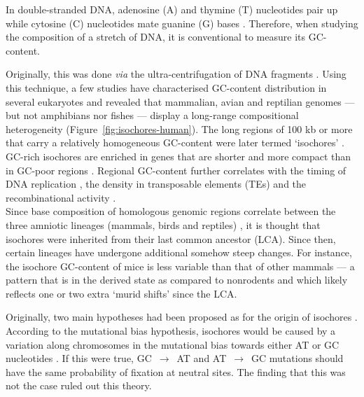 In double-stranded DNA, adenosine (A) and thymine (T) nucleotides pair up while cytosine (C) nucleotides mate guanine (G) bases \citep[reviewed in \citealp{kresge2005chargaff}]{chargaff1950chemical}.
Therefore, when studying the composition of a stretch of DNA, it is conventional to measure its GC-content.

Originally, this was done \textit{via} the ultra-centrifugation of DNA fragments \citep{meselson1957equilibrium,corneo1968isolation}.
Using this technique, a few studies have characterised GC-content distribution in several eukaryotes \citep{filipski1973analysis,thiery1976analysis,macaya1976approach,macaya1978analysis,cortadas1977analysis} and revealed that mammalian, avian and reptilian genomes — but not amphibians nor fishes \citep{bernardi1990compositional} — display a long-range compositional heterogeneity (Figure~\ref{fig:isochores-human}).
The long regions of 100 kb or more that carry a relatively homogeneous GC-content were later termed ‘isochores’ \citep{cuny1981major}.\\


GC-rich isochores are enriched in genes \citep[reviewed in \citealp{bernardi2005distribution}]{bernardi1985mosaic,mouchiroud1991distribution,lander2001initial} that are shorter and more compact than in GC-poor regions \citep{duret1995statistical}.
Regional GC-content further correlates with the timing of DNA replication \citep{federico1998generichest,watanabe2002chromosomewide,costantini2008replication}, the density in transposable elements (TEs) \citep{smit1999interspersed,lander2001initial,mousegenomesequencingconsortium2002initial} and the recombinational activity \citep{fullerton2001local,kong2002highresolution}.\\


Since base composition of homologous genomic regions correlate between the three amniotic lineages (mammals, birds and reptiles) \citep{kadi1993compositional,caccio1994singlecopy,hughes1999warmblooded}, it is thought that isochores were inherited from their last common ancestor (LCA).
Since then, certain lineages have undergone additional somehow steep changes.
For instance, the isochore GC-content of mice is less variable than that of other mammals — a pattern that is in the derived state as compared to nonrodents \citep{galtier1998isochore} and which likely reflects one \citep{mouchiroud1988compositional} or two \citep{smith2002compositional} extra ‘murid shifts’ since the LCA\@.

Originally, two main hypotheses had been proposed as for the origin of isochores \citep[reviewed in][]{duret2009biased}.
According to the mutational bias hypothesis, isochores would be caused by a variation along chromosomes in the mutational bias towards either AT or GC nucleotides \citep{filipski1988why,wolfe1989mutation,francino1999isochores,fryxell2000cytosine}.
If this were true, GC~$\rightarrow$~AT and AT~$\rightarrow$~GC mutations should have the same probability of fixation at neutral sites.
The finding that this was not the case \citep{eyre-walker1999evidence, smith2001synonymous, lercher2002evolution, webster2004fixation, spencer2006influence} ruled out this theory.

